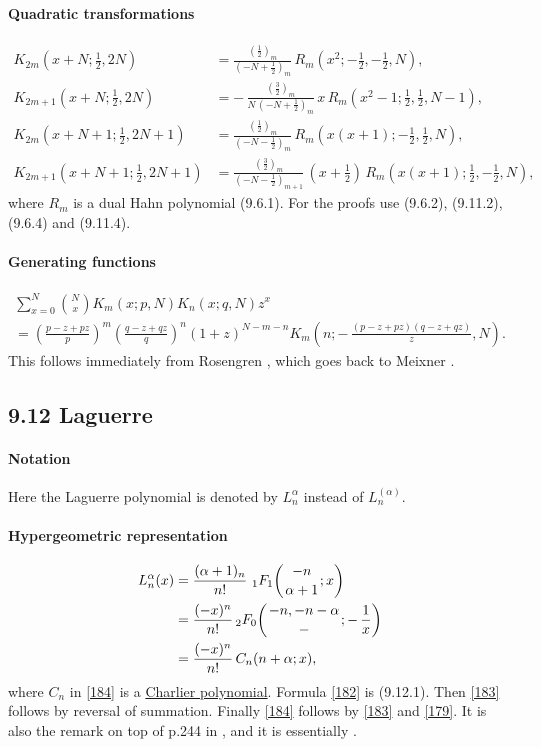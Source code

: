\documentclass[twoside,11pt]{article}
\newcommand\al\alpha
\newcommand\thalf{\tfrac12}
\newcommand{\hyp}[5]{\,\mbox{}_{#1}F_{#2}\!\left(
  \genfrac{}{}{0pt}{}{#3}{#4};#5\right)}
\begin{document}
\paragraph{Quadratic transformations}
\begin{align}
K_{2m}(x+N;\thalf,2N)&=\frac{(\thalf)_m}{(-N+\thalf)_m}\,
R_m(x^2;-\thalf,-\thalf,N),
\label{31}\\
K_{2m+1}(x+N;\thalf,2N)&=-\,\frac{(\tfrac32)_m}{N\,(-N+\thalf)_m}\,
x\,R_m(x^2-1;\thalf,\thalf,N-1),
\label{33}\\
K_{2m}(x+N+1;\thalf,2N+1)&=\frac{(\tfrac12)_m}{(-N-\thalf)_m}\,
R_m(x(x+1);-\thalf,\thalf,N),
\label{32}\\
K_{2m+1}(x+N+1;\thalf,2N+1)&=\frac{(\tfrac32)_m}{(-N-\thalf)_{m+1}}\,
(x+\thalf)\,R_m(x(x+1);\thalf,-\thalf,N),
\label{34}
\end{align}
where $R_m$ is a dual Hahn polynomial (9.6.1). For the proofs use
(9.6.2), (9.11.2), (9.6.4) and (9.11.4).
%
\paragraph{Generating functions}
\begin{multline}
\sum_{x=0}^N\binom Nx K_m(x;p,N)K_n(x;q,N)z^x\\
=\left(\frac{p-z+pz}p\right)^m
\left(\frac{q-z+qz}q\right)^n
(1+z)^{N-m-n}
K_m\left(n;-\,\frac{(p-z+pz)(q-z+qz)}z,N\right).
\label{107}
\end{multline}
This follows immediately from Rosengren \cite[(3.5)]{K8}, which goes back
to Meixner \cite{K9}.
%
\subsection*{9.12 Laguerre}
\label{sec9.12}
\paragraph{Notation}
Here the Laguerre polynomial is denoted by $L_n^\al$ instead of
$L_n^{(\al)}$.
%
\paragraph{Hypergeometric representation}
\begin{align}
L_n^\al(x)&=
\frac{(\al+1)_n}{n!}\,\hyp11{-n}{\al+1}x
\label{182}\\
&=\frac{(-x)^n}{n!} \hyp20{-n,-n-\al}-{-\,\frac1x}
\label{183}\\
&=\frac{(-x)^n}{n!}\,C_n(n+\al;x),
\label{184}
\end{align}
where $C_n$ in \eqref{184} is a
\hyperref[sec9.14]{Charlier polynomial}.
Formula \eqref{182} is (9.12.1). Then \eqref{183} follows by reversal
of summation. Finally \eqref{184} follows by \eqref{183} and \eqref{179}.
It is also the remark on top of p.244 in , and it is essentially
.
%
\end{document}
